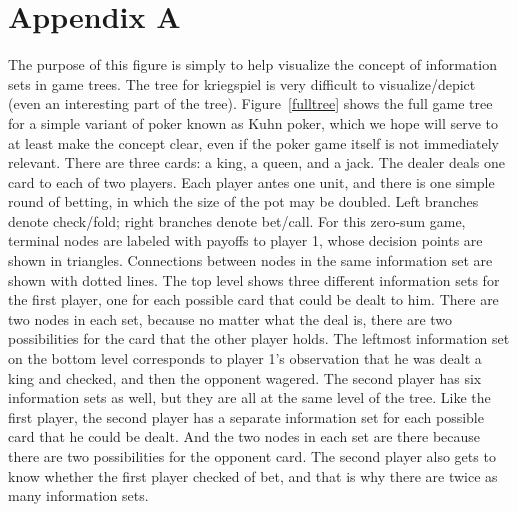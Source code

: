 \documentclass[conference]{IEEEtran}
\begin{document}
\section{Appendix A}
The purpose of this figure is simply to help visualize the concept of information sets in game trees.  The tree for
kriegspiel is very difficult to visualize/depict (even an interesting part of the tree).  Figure~\ref{fulltree} shows
the full game tree for a simple variant of poker known as Kuhn poker, which we hope will serve to at least make the
concept clear, even if the poker game itself is not immediately relevant.  There are three cards: a king, a queen, and a
jack.  The dealer deals one card to each of two players.  Each player antes one unit, and there is one simple round of
betting, in which the size of the pot may be doubled.  Left branches denote check/fold; right branches denote bet/call.
For this zero-sum game, terminal nodes are labeled with payoffs to player 1, whose decision points are shown in
triangles.  Connections between nodes in the same information set are shown with dotted lines.  The top level shows
three different information sets for the first player, one for each possible card that could be dealt to him.  There are
two nodes in each set, because no matter what the deal is, there are two possibilities for the card that the other
player holds.  The leftmost information set on the bottom level corresponds to player 1's observation that he was dealt
a king and checked, and then the opponent wagered.  The second player has six information sets as well, but they are all
at the same level of the tree.  Like the first player, the second player has a separate information set for each
possible card that he could be dealt.  And the two nodes in each set are there because there are two possibilities for
the opponent card.  The second player also gets to know whether the first player checked of bet, and that is why there
are twice as many information sets.
\end{document}
